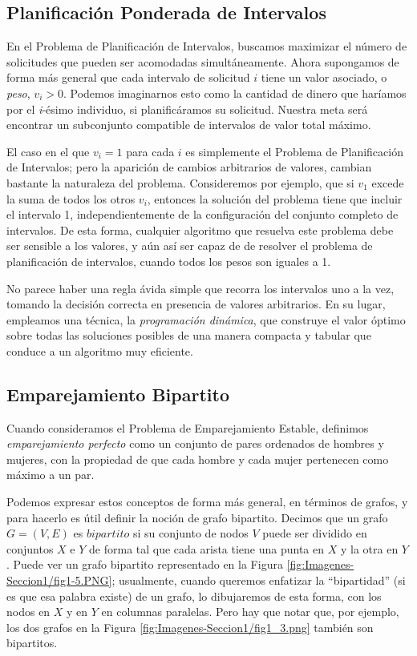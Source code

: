 \documentclass[a4paper, 12pt]{book}
\begin{document}
\subsection*{Planificación Ponderada de Intervalos}

En el Problema de Planificación de Intervalos, buscamos maximizar el número de solicitudes que pueden ser acomodadas simultáneamente. Ahora supongamos de forma más general que cada intervalo de solicitud $i$ tiene un valor asociado, o \textit{peso}, $v_i > 0$. Podemos imaginarnos esto como la cantidad de dinero que haríamos por el \textit{i}-ésimo individuo, si planificáramos su solicitud. Nuestra meta será encontrar un subconjunto compatible de intervalos de valor total máximo.

El caso en el que $v_i = 1$ para cada $i$ es simplemente el Problema de Planificación de Intervalos; pero la aparición de cambios arbitrarios de valores, cambian bastante la naturaleza del problema. Consideremos por ejemplo, que si $v_1$ excede la suma de todos los otros $v_i$, entonces la solución del problema tiene que incluir el intervalo 1, independientemente de la configuración del conjunto completo de intervalos. De esta forma, cualquier algoritmo que resuelva este problema debe ser sensible a los valores, y aún así ser capaz de de resolver el problema de planificación de intervalos, cuando todos los pesos son iguales a 1.

No parece haber una regla ávida simple que recorra los intervalos uno a la vez, tomando la decisión correcta en presencia de valores arbitrarios.
En su lugar, empleamos una técnica, la \textit{programación dinámica}, que construye el valor óptimo sobre todas las soluciones posibles de una manera compacta y tabular que conduce a un algoritmo muy eficiente.

\subsection*{Emparejamiento Bipartito}

Cuando consideramos el Problema de Emparejamiento Estable, definimos \textit{emparejamiento perfecto} como un conjunto de pares ordenados de hombres y mujeres, con la propiedad de que cada hombre y cada mujer pertenecen como máximo a un par.

Podemos expresar estos conceptos de forma más general, en términos de grafos, y para hacerlo es útil definir la noción de grafo bipartito. Decimos que un grafo $G = (V,E)$ es $bipartito$ si su conjunto de nodos $V$ puede ser dividido en conjuntos $X$ e $Y$ de forma tal que cada arista tiene una punta en $X$ y la otra en $Y$. Puede ver un grafo bipartito representado en la Figura \ref{fig:Imagenes-Seccion1/fig1-5.PNG}; usualmente, cuando queremos enfatizar la ``bipartidad'' (si es que esa palabra existe) de un grafo, lo dibujaremos de esta forma, con los nodos en $X$ y en $Y$ en columnas paralelas. Pero hay que notar que, por ejemplo, los dos grafos en la Figura \ref{fig:Imagenes-Seccion1/fig1_3.png} también son bipartitos.
\end{document}
